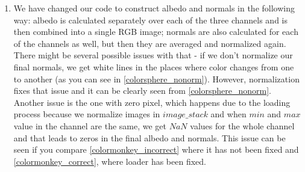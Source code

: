 \documentclass{article}
\begin{document}
\begin{enumerate}
    \item We have changed our code to construct albedo and normals in the following way: albedo is calculated separately over each of the three channels and is then combined into a single RGB image; normals are also calculated for each of the channels as well, but then they are averaged and normalized again. There might be several possible issues with that - if we don't normalize our final normals, we get white lines in the places where color changes from one to another (as you can see in \cref{colorsphere_nonorm}). However, normalization fixes that issue and it can be clearly seen from \cref{colorsphere_nonorm}.
    Another issue is the one with zero pixel, which happens due to the loading process because we normalize images in $image\_stack$ and when $min$ and $max$ value in the channel are the same, we get $NaN$ values for the whole channel and that leads to zeros in the final albedo and normals. This issue can be seen if you compare \cref{colormonkey_incorrect} where it has not been fixed and \cref{colormonkey_correct}, where loader has been fixed.
    
    
    

\end{enumerate}
\end{document}
